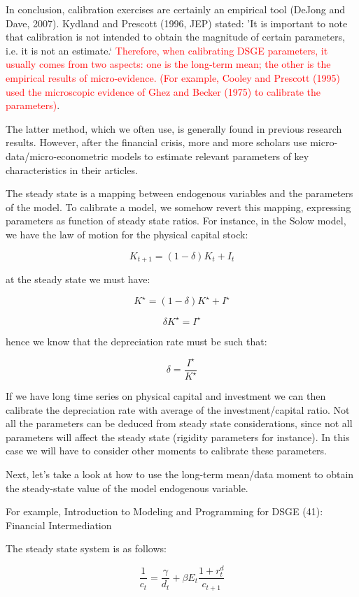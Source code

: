 \documentclass[10pt,math=newtx,citestyle=gb7714-2015,bibstyle=gb7714-2015]{elegantbook}
\begin{document}
	In conclusion, calibration exercises are certainly an empirical tool (DeJong and Dave, 2007). Kydland and Prescott (1996, JEP) stated: ’It is important to note that calibration is not intended to obtain the magnitude of certain parameters, i.e. it is not an estimate.‘ \textcolor{red}{Therefore, when calibrating DSGE parameters, it usually comes from two aspects: one is the long-term mean; the other is the empirical results of micro-evidence. (For example, Cooley and Prescott (1995) used the microscopic evidence of Ghez and Becker (1975) to calibrate the parameters)}.
	
	The latter method, which we often use, is generally found in previous research results. However, after the financial crisis, more and more scholars use micro-data/micro-econometric models to estimate relevant parameters of key characteristics in their articles.
	
	The steady state is a mapping between endogenous variables and the parameters of the model. To calibrate a model, we somehow revert this mapping, expressing parameters as function of steady state ratios. For instance, in the Solow model, we have the law of motion for the physical capital stock:
	
	$$K_{t+1}=(1-\delta)K_t+I_t$$
	
	at the steady state we must have:
	
	$$K^{\star}=(1-\delta)K^{\star}+I^{\star}$$
	
	$$\delta K^{\star}=I^{\star}$$
	
	hence we know that the depreciation rate must be such that:
	
	$$\delta=\frac{I^{\star}}{K^{\star}}$$
	
	If we have long time series on physical capital and investment we can then calibrate the depreciation rate with average of the investment/capital ratio. Not all the parameters can be deduced from steady state considerations, since not all parameters will affect the steady state (rigidity parameters for instance). In this case we will have to consider other moments to calibrate these parameters.
	
	Next, let's take a look at how to use the long-term mean/data moment to obtain the steady-state value of the model endogenous variable.
	
	For example, Introduction to Modeling and Programming for DSGE (41): Financial Intermediation
	
	The steady state system is as follows:
	
	\begin{equation}\label{label}
		\frac{1}{c_t}=\frac{\gamma}{d_t}+\beta E_t\frac{1+r_t^d}{c_{t+1}}
	\end{equation}
	
\end{document}
